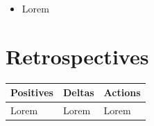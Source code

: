 \documentclass[10pt, onecolumn, draftclsnofoot, letterpaper, compsoc]{IEEEtran}
\begin{document}
    \begin{itemize}

	\item Lorem

    \end{itemize}

\newpage
\section{Retrospectives}

\begin{table}[!h]
    \centering
    \begin{tabular}{|p{.3\linewidth}|p{.3\linewidth}|p{.3\linewidth}|}

    \cline{3-3}

    \hline \textbf{Positives} & \textbf{Deltas} & \textbf{Actions} \\ \hline

    Lorem & Lorem & Lorem \\ \hline

    \end{tabular}
\end{table}
\end{document}
